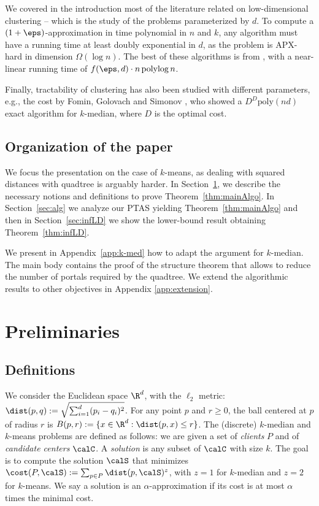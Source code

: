 We covered in the introduction most of the literature related on low-dimensional clustering -- which is the study of the problems parameterized by $d$. To compute a $(1+\eps)$-approximation in time polynomial in $n$ and $k$, any algorithm must have a running time at least doubly exponential in $d$, as the problem is APX-hard in dimension $\Omega(\log n)$. The best of these algorithms is from \cite{jacm}, with a near-linear running time of $f(\eps, d)\cdot  n \operatorname{polylog} n$. 

Finally, tractability of clustering has also been studied with different parameters, e.g., the cost by Fomin, Golovach and Simonov \cite{FominGS21}, who showed a $D^D \mathrm{poly}(nd)$ exact algorithm for $k$-median, where $D$ is the optimal cost. 

\subsection{Organization of the paper}
We focus the presentation on the case of $k$-means, as dealing with squared distances with quadtree is arguably harder. In Section~\ref{sec:prelim}, we describe the necessary notions and definitions to prove Theorem~\ref{thm:mainAlgo}. In Section~\ref{sec:alg} we analyze our PTAS yielding Theorem~\ref{thm:mainAlgo} and then in Section~\ref{sec:infLD} we show the lower-bound result obtaining Theorem~\ref{thm:infLD}.

We present in Appendix~\ref{app:k-med} how to adapt the argument for $k$-median. 
The main body contains the proof of the structure theorem that allows to reduce the number of portals required by the quadtree. 
We  extend the algorithmic results to other objectives in Appendix \ref{app:extension}.




\section{Preliminaries}\label{sec:prelim}
\subsection{Definitions}

We consider the Euclidean space $\R^d$, with the $\ell_2$ metric: $\dist(p, q) := \sqrt{\sum_{i=1}^d (p_i - q_i)^2}$. 
For any point $p$ and $r \geq 0$, the ball centered at $p$ of radius $r$ is $B(p,r) := \{x \in \R^d: \dist(p, x) \leq r\}$.
The (discrete) $k$-median and $k$-means problems are defined as follows: we are given a set of \emph{clients} $P$ and of \emph{candidate centers} $\calC$. A \emph{solution} is any subset of $\calC$ with size $k$. 
The goal is to compute the solution $\calS$ that minimizes $\cost(P, \calS) := \sum_{p \in P} \dist(p, \calS)^z$, with $z=1$ for $k$-median and $z=2$ for $k$-means.
We say a solution is an $\alpha$-approximation if its cost is at most $\alpha$ times the minimal cost.


